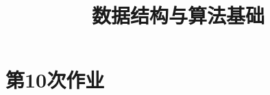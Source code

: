 \documentclass{../mynote}
\title{数据结构与算法基础}
\begin{document}
\maketitle

% 

\section{第10次作业}

\end{document}
